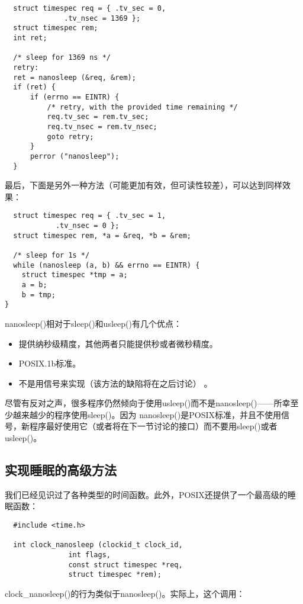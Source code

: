 \begin{lstlisting}
  struct timespec req = { .tv_sec = 0,
			  .tv_nsec = 1369 };
  struct timespec rem;
  int ret;
 
  /* sleep for 1369 ns */
  retry:
  ret = nanosleep (&req, &rem);
  if (ret) {
      if (errno == EINTR) {
          /* retry, with the provided time remaining */
          req.tv_sec = rem.tv_sec;
          req.tv_nsec = rem.tv_nsec;
          goto retry;
      }
      perror ("nanosleep");
  }
\end{lstlisting}

最后，下面是另外一种方法（可能更加有效，但可读性较差），可以达到同样效果： 

\begin{lstlisting}
  struct timespec req = { .tv_sec = 1,
			.tv_nsec = 0 };
  struct timespec rem, *a = &req, *b = &rem;

  /* sleep for 1s */
  while (nanosleep (a, b) && errno == EINTR) {
 	struct timespec *tmp = a;
 	a = b;
	b = tmp;
}
\end{lstlisting}

nanosleep()相对于sleep()和usleep()有几个优点： 

\begin{itemize}
\item 提供纳秒级精度，其他两者只能提供秒或者微秒精度。 
\item POSIX.1b标准。 
\item 不是用信号来实现（该方法的缺陷将在之后讨论） 。
\end{itemize}

尽管有反对之声，很多程序仍然倾向于使用usleep()而不是nanosleep()——所幸至少越来越少的程序使用sleep()。因为 nanosleep()是POSIX标准，并且不使用信号，新程序最好使用它（或者将在下一节讨论的接口）而不要用sleep()或者usleep()。 

\subsection{实现睡眠的高级方法}

我们已经见识过了各种类型的时间函数。此外，POSIX还提供了一个最高级的睡眠函数： 

\begin{lstlisting}
  #include <time.h>

  int clock_nanosleep (clockid_t clock_id,
		       int flags,
		       const struct timespec *req,
		       struct timespec *rem);
\end{lstlisting}

clock\_nanosleep()的行为类似于nanosleep()。实际上，这个调用： 


